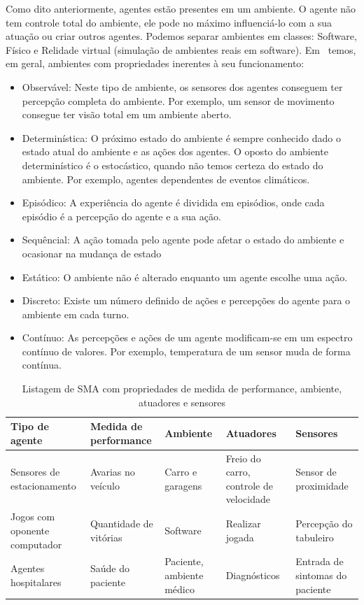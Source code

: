 Como dito anteriormente, agentes estão presentes em um ambiente. O agente não tem controle total do ambiente, ele pode no máximo influenciá-lo com a sua atuação ou criar outros agentes. Podemos separar ambientes em classes: Software, Físico e Relidade virtual (simulação de ambientes reais em software). Em~\cite{wooldridge04} temos, em geral, ambientes com propriedades inerentes à seu funcionamento:

\begin{itemize}
	\item Observável: Neste tipo de ambiente, os sensores dos agentes conseguem ter percepção completa do ambiente. Por exemplo, um sensor de movimento consegue ter visão total em um ambiente aberto.
	\item Determinística: O próximo estado do ambiente é sempre conhecido dado o estado atual do ambiente e as ações dos agentes. O oposto do ambiente determinístico é o estocástico, quando não temos certeza do estado do ambiente. Por exemplo, agentes dependentes de eventos climáticos.
	\item Episódico: A experiência do agente é dividida em episódios, onde cada episódio é a percepção do agente e a sua ação.
	\item Sequêncial: A ação tomada pelo agente pode afetar o estado do ambiente e ocasionar na mudança de estado
	\item Estático: O ambiente não é alterado enquanto um agente escolhe uma ação.
	\item Discreto: Existe um número definido de ações e percepções do agente para o ambiente em cada turno.
	\item Contínuo: As percepções e ações de um agente modificam-se em um espectro contínuo de valores. Por exemplo, temperatura de um sensor muda de forma contínua.
\end{itemize}

\begin{table}
	\caption{Listagem de SMA com propriedades de medida de performance, ambiente, atuadores e sensores}
	\begin{tabular}{|p{3cm} | p{3cm} | p{2cm}| p{3cm} | p{3cm} |}
		\hline
		\textbf{Tipo de agente}	& \textbf{Medida de performance} & \textbf{Ambiente} & \textbf{Atuadores}  & \textbf{Sensores}	\\
		\hline
		Sensores de estacionamento	& Avarias no veículo & Carro e garagens & Freio do carro, controle de velocidade & Sensor de proximidade	\\
		\hline
		Jogos com oponente computador	& Quantidade de vitórias &	Software & Realizar jogada & Percepção do tabuleiro	\\
		\hline
		Agentes hospitalares		& Saúde do paciente & Paciente, ambiente médico & Diagnósticos & Entrada de sintomas do paciente	\\
		\hline
	\end{tabular}
	\label{lista_agentes}
\end{table}
 
